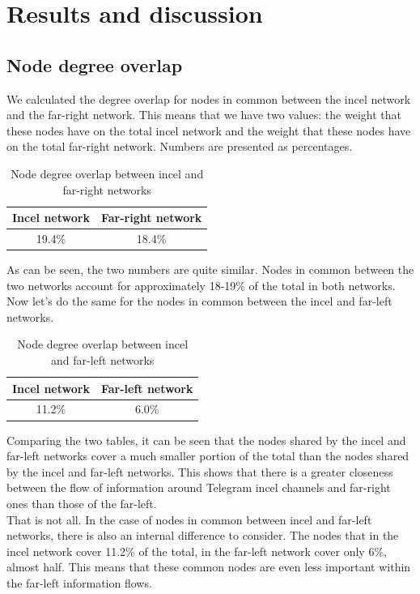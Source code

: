 \documentclass[a4paper,twoside,12pt, openany]{book}
\begin{document}
\chapter{Results and discussion}
\section{Node degree overlap}
\label{sec:node_degree}
We calculated the degree overlap for nodes in common between the incel network and the far-right network. This means that we have two values: the weight that these nodes have on the total incel network and the weight that these nodes have on the total far-right network. Numbers are presented as percentages.
\\

\renewcommand{\arraystretch}{1.5}

\begin{table}[h!]
\centering
	\begin{tabular}{| c | c |}
		\hline 
		Incel network & Far-right network \\ 
		\hline 
		19.4\% & 18.4\% \\ 
		\hline
	\end{tabular}
	\caption{Node degree overlap between incel and far-right networks}
\end{table}

As can be seen, the two numbers are quite similar. Nodes in common between the two networks account for approximately 18-19\% of the total in both networks. Now let's do the same for the nodes in common between the incel and far-left networks.
\\

\begin{table}[h!]
	\centering
	\begin{tabular}{| c | c |}
		\hline 
		Incel network & Far-left network \\ 
		\hline 
		11.2\% & 6.0\% \\ 
		\hline
	\end{tabular}
	\caption{Node degree overlap between incel and far-left networks}
\end{table}

Comparing the two tables, it can be seen that the nodes shared by the incel and far-left networks cover a much smaller portion of the total than the nodes shared by the incel and far-left networks. This shows that there is a greater closeness between the flow of information around Telegram incel channels and far-right ones than those of the far-left. \\
That is not all. In the case of nodes in common between incel and far-left networks, there is also an internal difference to consider. The nodes that in the incel network cover 11.2\% of the total, in the far-left network cover only 6\%, almost half. This means that these common nodes are even less important within the far-left information flows.
\end{document}
